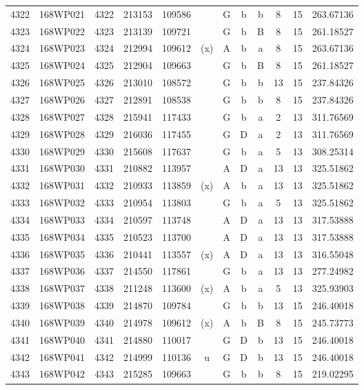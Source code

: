 \begin{tabular}{|*{12}{c|}}
4322 & 168WP021 & 4322 & 213153 & 109586 &  & G & b & b & 8 & 15 & 263.67136 \\ 
4323 & 168WP022 & 4323 & 213139 & 109721 &  & G & b & B & 8 & 15 & 261.18527 \\ 
4324 & 168WP023 & 4324 & 212994 & 109612 & (x) & A & b & a & 8 & 15 & 263.67136 \\ 
4325 & 168WP024 & 4325 & 212904 & 109663 &  & G & b & B & 8 & 15 & 261.18527 \\ 
4326 & 168WP025 & 4326 & 213010 & 108572 &  & G & b & b & 13 & 15 & 237.84326 \\ 
4327 & 168WP026 & 4327 & 212891 & 108538 &  & G & b & b & 8 & 15 & 237.84326 \\ 
4328 & 168WP027 & 4328 & 215941 & 117433 &  & G & b & a & 2 & 13 & 311.76569 \\ 
4329 & 168WP028 & 4329 & 216036 & 117455 &  & G & D & a & 2 & 13 & 311.76569 \\ 
4330 & 168WP029 & 4330 & 215608 & 117637 &  & G & b & a & 5 & 13 & 308.25314 \\ 
4331 & 168WP030 & 4331 & 210882 & 113957 &  & A & D & a & 13 & 13 & 325.51862 \\ 
4332 & 168WP031 & 4332 & 210933 & 113859 & (x) & A & b & a & 13 & 13 & 325.51862 \\ 
4333 & 168WP032 & 4333 & 210954 & 113803 &  & G & b & a & 5 & 13 & 325.51862 \\ 
4334 & 168WP033 & 4334 & 210597 & 113748 &  & A & D & a & 13 & 13 & 317.53888 \\ 
4335 & 168WP034 & 4335 & 210523 & 113700 &  & A & D & a & 13 & 13 & 317.53888 \\ 
4336 & 168WP035 & 4336 & 210441 & 113557 & (x) & A & D & a & 13 & 13 & 316.55048 \\ 
4337 & 168WP036 & 4337 & 214550 & 117861 &  & G & b & a & 13 & 13 & 277.24982 \\ 
4338 & 168WP037 & 4338 & 211248 & 113600 & (x) & A & b & a & 5 & 13 & 325.93903 \\ 
4339 & 168WP038 & 4339 & 214870 & 109784 &  & G & b & b & 13 & 15 & 246.40018 \\ 
4340 & 168WP039 & 4340 & 214978 & 109612 & (x) & A & b & B & 8 & 15 & 245.73773 \\ 
4341 & 168WP040 & 4341 & 214880 & 110017 &  & G & D & b & 13 & 15 & 246.40018 \\ 
4342 & 168WP041 & 4342 & 214999 & 110136 & u & G & D & b & 13 & 15 & 246.40018 \\ 
4343 & 168WP042 & 4343 & 215285 & 109663 &  & G & b & b & 8 & 15 & 219.02295 \\ 

\end{tabular}
